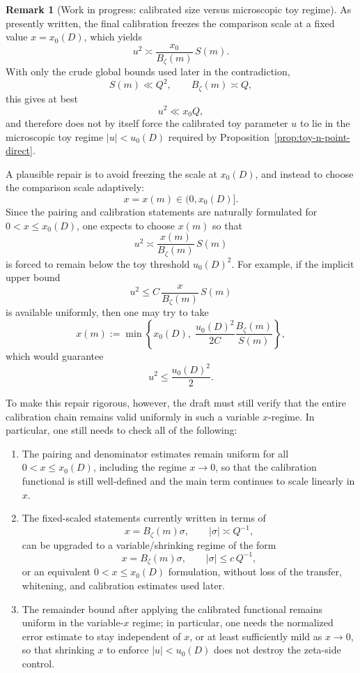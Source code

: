 \documentclass[11pt,a4paper]{amsart}
\theoremstyle{plain}
\theoremstyle{definition}
\newtheorem{remark}[theorem]{Remark}
\begin{document}
\begin{remark}[Work in progress: calibrated size versus microscopic toy regime]
\label{rem:wip-calibration-small-u}
As presently written, the final calibration freezes the comparison scale at a
fixed value $x=x_0(D)$, which yields
\[
u^2 \asymp \frac{x_0}{B_\zeta(m)}\,S(m).
\]
With only the crude global bounds used later in the contradiction,
\[
S(m)\ll Q^2,
\qquad
B_\zeta(m)\asymp Q,
\]
this gives at best
\[
u^2\ll x_0 Q,
\]
and therefore does not by itself force the calibrated toy parameter $u$ to
lie in the microscopic toy regime $|u|<u_0(D)$ required by
Proposition~\ref{prop:toy-n-point-direct}.

A plausible repair is to avoid freezing the scale at $x_0(D)$, and instead
to choose the comparison scale adaptively:
\[
x=x(m)\in (0,x_0(D)].
\]
Since the pairing and calibration statements are naturally formulated for
$0<x\le x_0(D)$, one expects to choose $x(m)$ so that
\[
u^2 \asymp \frac{x(m)}{B_\zeta(m)}\,S(m)
\]
is forced to remain below the toy threshold $u_0(D)^2$.  For example, if
the implicit upper bound
\[
u^2 \le C\,\frac{x}{B_\zeta(m)}\,S(m)
\]
is available uniformly, then one may try to take
\[
x(m):=
\min\!\left\{
x_0(D),\;
\frac{u_0(D)^2}{2C}\frac{B_\zeta(m)}{S(m)}
\right\},
\]
which would guarantee
\[
u^2\le \frac{u_0(D)^2}{2}.
\]

To make this repair rigorous, however, the draft must still verify that the
entire calibration chain remains valid uniformly in such a variable
$x$-regime.  In particular, one still needs to check all of the following:

\begin{enumerate}
\item The pairing and denominator estimates remain uniform for all
$0<x\le x_0(D)$, including the regime $x\to 0$, so that the calibration
functional is still well-defined and the main term continues to scale linearly
in $x$.

\item The fixed-scaled statements currently written in terms of
\[
x=B_\zeta(m)\sigma,
\qquad
|\sigma|\asymp Q^{-1},
\]
can be upgraded to a variable/shrinking regime of the form
\[
x=B_\zeta(m)\sigma,
\qquad
|\sigma|\le c\,Q^{-1},
\]
or an equivalent $0<x\le x_0(D)$ formulation, without loss of the transfer,
whitening, and calibration estimates used later.

\item The remainder bound after applying the calibrated functional remains
uniform in the variable-$x$ regime; in particular, one needs the normalized
error estimate to stay independent of $x$, or at least sufficiently mild as
$x\to 0$, so that shrinking $x$ to enforce $|u|<u_0(D)$ does not
destroy the zeta-side control.


\end{enumerate}
\end{remark}
\end{document}
